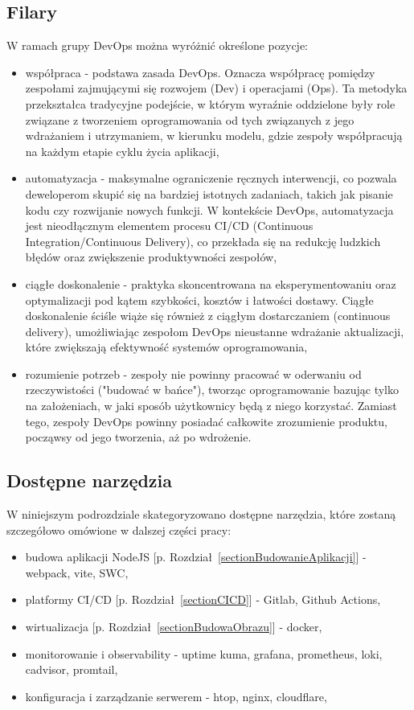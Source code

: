 \documentclass{article}
\newcommand{\chapref}[1]{[p. Rozdział~\ref{#1}]}
\begin{document}
\subsection{Filary}
W ramach grupy DevOps można wyróżnić określone pozycje:
\begin{itemize}
    \item współpraca - podstawa zasada DevOps. Oznacza współpracę pomiędzy zespołami zajmującymi się rozwojem (Dev) i operacjami (Ops). Ta metodyka przekształca tradycyjne podejście, w którym wyraźnie oddzielone były role związane z tworzeniem oprogramowania od tych związanych z jego wdrażaniem i utrzymaniem, w kierunku modelu, gdzie zespoły współpracują na każdym etapie cyklu życia aplikacji,
    \item automatyzacja - maksymalne ograniczenie ręcznych interwencji, co pozwala deweloperom skupić się na bardziej istotnych zadaniach, takich jak pisanie kodu czy rozwijanie nowych funkcji. W kontekście DevOps, automatyzacja jest nieodłącznym elementem procesu CI/CD (Continuous Integration/Continuous Delivery), co przekłada się na redukcję ludzkich błędów oraz zwiększenie produktywności zespołów,
    \item ciągłe doskonalenie - praktyka skoncentrowana na eksperymentowaniu oraz optymalizacji pod kątem szybkości, kosztów i łatwości dostawy. Ciągłe doskonalenie ściśle wiąże się również z ciągłym dostarczaniem (continuous delivery), umożliwiając zespołom DevOps nieustanne wdrażanie aktualizacji, które zwiększają efektywność systemów oprogramowania,
    \item rozumienie potrzeb - zespoły nie powinny pracować w oderwaniu od rzeczywistości ("budować w bańce"), tworząc oprogramowanie bazując tylko na założeniach, w jaki sposób użytkownicy będą z niego korzystać. Zamiast tego, zespoły DevOps powinny posiadać całkowite zrozumienie produktu, począwsy od jego tworzenia, aż po wdrożenie.
\end{itemize}

\subsection{Dostępne narzędzia}

W niniejszym podrozdziale skategoryzowano dostępne narzędzia, które zostaną szczegółowo omówione w dalszej części pracy:

\begin{itemize}
    \item budowa aplikacji NodeJS \chapref{sectionBudowanieAplikacji} - webpack, vite, SWC,
    \item platformy CI/CD \chapref{sectionCICD} - Gitlab, Github Actions,
    \item wirtualizacja \chapref{sectionBudowaObrazu} - docker,
    \item monitorowanie i observability - uptime kuma, grafana, prometheus, loki, cadvisor, promtail,
    \item konfiguracja i zarządzanie serwerem - htop, nginx, cloudflare,
\end{itemize}
\end{document}
